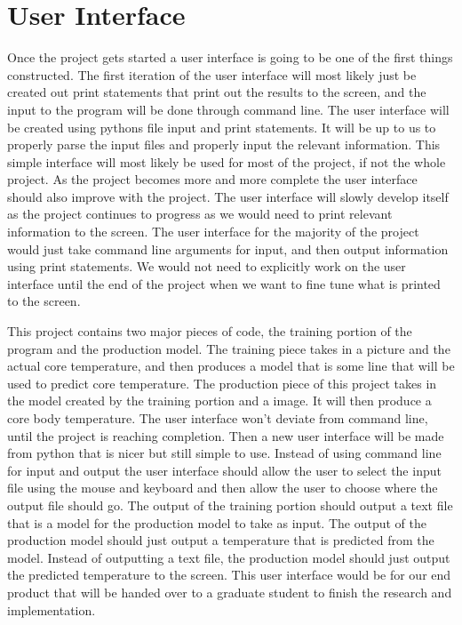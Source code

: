 \documentclass[onecolumn, draftclsnofoot,10pt, compsoc]{IEEEtran}
\begin{document}
\section{User Interface}
Once the project gets started a user interface is going to be one of the first things constructed. The first iteration of the user interface will most likely just be created out print statements that print out the results to the screen, and the input to the program will be done through command line. The user interface will be created using pythons file input and print statements. It will be up to us to properly parse the input files and properly input the relevant information. This simple interface will most likely be used for most of the project, if not the whole project. As the project becomes more and more complete the user interface should also improve with the project. The user interface will slowly develop itself as the project continues to progress as we would need to print relevant information to the screen. The user interface for the majority of the project would just take command line arguments for input, and then output information using print statements. We would not need to explicitly work on the user interface until the end of the project when we want to fine tune what is printed to the screen.

This project contains two major pieces of code, the training portion of the program and the production model. The training piece takes in a picture and the actual core temperature, and then produces a model that is some line that will be used to predict core temperature. The production piece of this project takes in the model created by the training portion and a image. It will then produce a core body temperature. The user interface won’t deviate from command line, until the project is reaching completion. Then a new user interface will be made from python that is nicer but still simple to use. Instead of using command line for input and output the user interface should allow the user to select the input file using the mouse and keyboard and then allow the user to choose where the output file should go. The output of the training portion should output a text file that is a model for the production model to take as input. The output of the production model should just output a temperature that is predicted from the model. Instead of outputting a text file, the production model should just output the predicted temperature to the screen. This user interface would be for our end product that will be handed over to a graduate student to finish the research and implementation.
\end{document}
